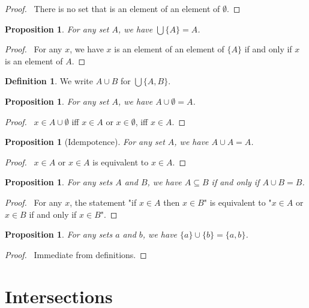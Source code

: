 \documentclass{report}
\let\qed\relax
\newtheorem{prop}[ax]{Proposition}
\theoremstyle{definition}
\newtheorem{df}[ax]{Definition}
\begin{document}
\begin{proof}
\pf\ There is no set that is an element of an element of $\emptyset$. \qed
\end{proof}

\begin{prop}
For any set $A$, we have $\bigcup \{A\} = A$.
\end{prop}

\begin{proof}
\pf\ For any $x$, we have $x$ is an element of an element of $\{A\}$ if and only if $x$ is an element of $A$. \qed
\end{proof}

\begin{df}
We write $A \cup B$ for $\bigcup \{A,B\}$.
\end{df}

\begin{prop}
For any set $A$, we have $A \cup \emptyset = A$.
\end{prop}

\begin{proof}
\pf\ $x \in A \cup \emptyset$ iff $x \in A$ or $x \in \emptyset$, iff $x \in A$. \qed
\end{proof}

\begin{prop}[Idempotence]
For any set $A$, we have $A \cup A = A$.
\end{prop}

\begin{proof}
\pf\ $x \in A$ or $x \in A$ is equivalent to $x \in A$. \qed
\end{proof}

\begin{prop}
For any sets $A$ and $B$, we have $A \subseteq B$ if and only if $A \cup B = B$.
\end{prop}

\begin{proof}
\pf\ For any $x$, the statement "if $x \in A$ then $x \in B$" is equivalent to "$x \in A$ or $x \in B$ if and only if $x \in B$". \qed
\end{proof}

\begin{prop}
For any sets $a$ and $b$, we have $\{a\} \cup \{b\} = \{a,b\}$.
\end{prop}

\begin{proof}
\pf\ Immediate from definitions. \qed
\end{proof}

\section{Intersections}
\end{document}
